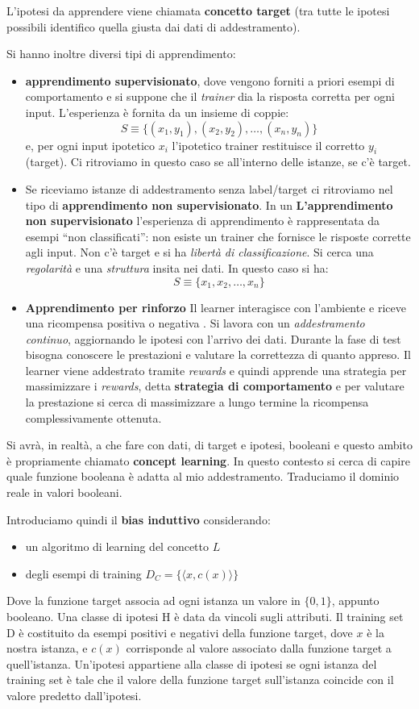 L'ipotesi da apprendere viene chiamata \textbf{concetto target} (tra tutte le ipotesi possibili identifico quella giusta dai dati di addestramento).

Si hanno inoltre diversi tipi di apprendimento: 
    \begin{itemize}
        \item \textbf{apprendimento supervisionato}, dove vengono forniti a priori esempi di comportamento e si suppone che il \textit{trainer} dia la risposta corretta per ogni input. L'esperienza è fornita da un insieme di coppie: \[S\equiv\{(x_1,y_1),(x_2,y_2),\ldots,(x_n,y_n)\}\] e, per ogni input ipotetico $x_i$ l'ipotetico trainer restituisce il corretto $y_i$ (target). Ci ritroviamo in questo caso se all'interno delle istanze, se c'è target.
        \item Se riceviamo istanze di addestramento senza label/target ci ritroviamo nel tipo di \textbf{apprendimento non supervisionato}. In un 
            \textbf{L'apprendimento non supervisionato} l’esperienza di apprendimento è rappresentata da esempi “non classificati”: non esiste un trainer che fornisce le risposte corrette agli input. Non c'è target e si ha \textit{libertà di classificazione}. Si cerca una \textit{regolarità} e una \textit{struttura} insita nei dati. In questo caso si ha:  \[S\equiv\{x_1,x_2,\ldots,x_n\}\]
        \item \textbf{Apprendimento per rinforzo} Il learner interagisce con l’ambiente e riceve una ricompensa positiva o negativa . Si lavora con un \textit{addestramento continuo}, aggiornando le ipotesi con l'arrivo dei dati. Durante la fase di test bisogna conoscere le prestazioni e valutare la correttezza di quanto appreso. Il learner viene addestrato tramite \textit{rewards} e quindi apprende una strategia per massimizzare i \textit{rewards}, detta \textbf{strategia di comportamento} e per valutare la prestazione si cerca di massimizzare a lungo termine la ricompensa complessivamente ottenuta.
    \end{itemize}
    
Si avrà, in realtà, a che fare con dati, di target e ipotesi, booleani e questo ambito è propriamente chiamato \textbf{concept learning}. In questo contesto si cerca di capire quale funzione booleana è adatta al mio addestramento. Traduciamo il dominio reale in valori booleani. 

Introduciamo quindi il \textbf{bias induttivo} considerando:
\begin{itemize}
  \item un algoritmo di learning del concetto $L$
  \item degli esempi di training $D_C=\{\langle x,c(x)\rangle\}$
\end{itemize}
Dove la funzione target associa ad ogni istanza un valore in $\{0,1\}$, appunto booleano. Una classe di ipotesi H è data da vincoli sugli attributi. Il training set D è costituito da esempi positivi e negativi della funzione target, dove $x$ è la nostra istanza, e $c(x)$ corrisponde al valore associato dalla funzione target a quell’istanza. Un’ipotesi appartiene alla classe di ipotesi se ogni istanza del training set è tale che il valore della funzione target sull’istanza coincide con il valore predetto dall’ipotesi.


